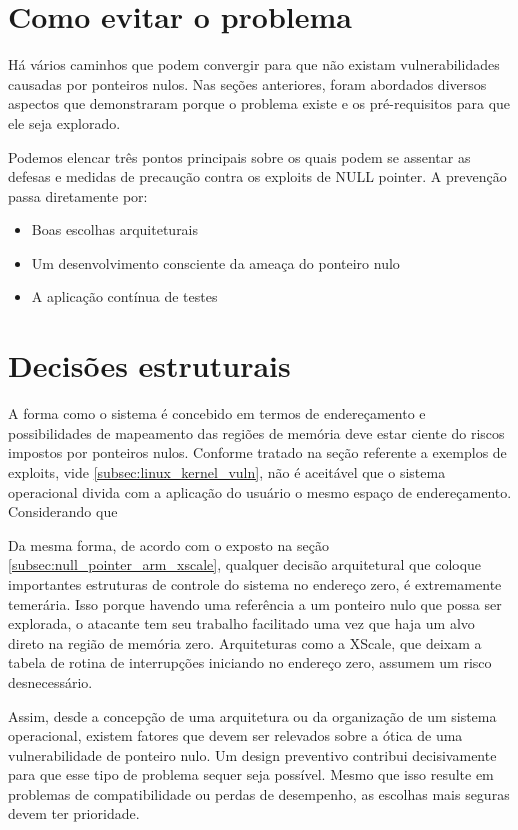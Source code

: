 						

	\section{Como evitar o problema}
		Há vários caminhos que podem convergir para que não existam vulnerabilidades causadas 
		por ponteiros nulos. Nas seções anteriores, foram abordados diversos aspectos que
		demonstraram porque o problema existe e os pré-requisitos para que ele seja explorado.
		

		Podemos elencar três pontos principais sobre os quais podem se assentar as defesas
		e medidas de precaução contra os exploits de NULL pointer.
		A prevenção passa diretamente por:
		\begin{itemize}
			\item{Boas escolhas arquiteturais}
			\item{Um desenvolvimento consciente da ameaça do ponteiro nulo}
			\item{A aplicação contínua de testes}
		\end{itemize}
	
		\section{Decisões estruturais}		
			A forma como o sistema é concebido em termos de endereçamento e possibilidades de mapeamento
			das regiões de memória deve estar ciente do riscos impostos por ponteiros nulos.
			Conforme tratado na seção referente a exemplos de exploits, vide \ref{subsec:linux_kernel_vuln},
			não é aceitável que o sistema operacional divida com a aplicação do usuário o mesmo espaço
			de endereçamento. Considerando que

			
			Da mesma forma, de acordo com o exposto na seção \ref{subsec:null_pointer_arm_xscale}, 
			qualquer decisão arquitetural que coloque importantes estruturas de controle do sistema no 
			endereço zero, é extremamente temerária.
			Isso porque havendo uma referência a um ponteiro nulo que possa ser explorada, o atacante
			tem seu trabalho facilitado uma vez que haja um alvo direto na região de memória zero.
			Arquiteturas como a XScale, que deixam a tabela de rotina de interrupções iniciando no endereço zero,
			assumem um risco desnecessário.


			Assim, desde a concepção de uma arquitetura ou da organização de um sistema operacional,
			existem fatores que devem ser relevados sobre a ótica de uma vulnerabilidade de ponteiro nulo.
			Um design preventivo contribui decisivamente para que esse tipo de problema sequer seja possível.
			Mesmo que isso resulte em problemas de compatibilidade ou perdas de desempenho, as escolhas
			mais seguras devem ter prioridade.

